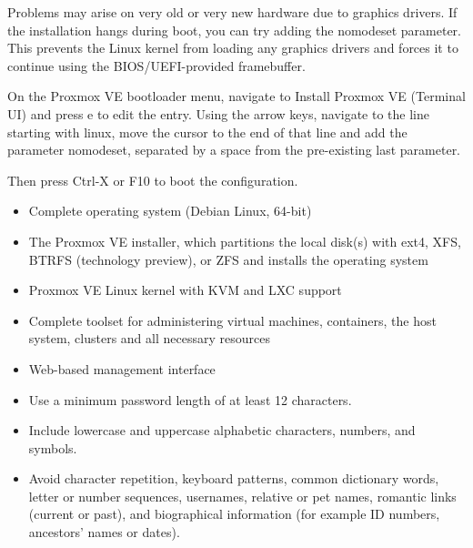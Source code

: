Problems may arise on very old or very new hardware due to graphics drivers. If the installation hangs during boot, you can try adding the nomodeset parameter. This prevents the Linux kernel from loading any graphics drivers and forces it to continue using the BIOS/UEFI-provided framebuffer.

On the Proxmox VE bootloader menu, navigate to Install Proxmox VE (Terminal UI) and press e to edit the entry. Using the arrow keys, navigate to the line starting with linux, move the cursor to the end of that line and add the parameter nomodeset, separated by a space from the pre-existing last parameter.

Then press Ctrl-X or F10 to boot the configuration.

\begin{itemize}[leftmargin=2cm]

	\item Complete operating system (Debian Linux, 64-bit)

	\item The Proxmox VE installer, which partitions the local disk(s) with ext4, XFS, BTRFS (technology preview), or ZFS and installs the operating system

	\item Proxmox VE Linux kernel with KVM and LXC support

	\item Complete toolset for administering virtual machines, containers, the host system, clusters and all necessary resources

	\item Web-based management interface

\end{itemize}

\begin{itemize}[leftmargin=2cm]

	\item Use a minimum password length of at least 12 characters.

	\item Include lowercase and uppercase alphabetic characters, numbers, and symbols.

	\item Avoid character repetition, keyboard patterns, common dictionary words, letter or number sequences, usernames, relative or pet names, romantic links (current or past), and biographical information (for example ID numbers, ancestors' names or dates).

\end{itemize}

